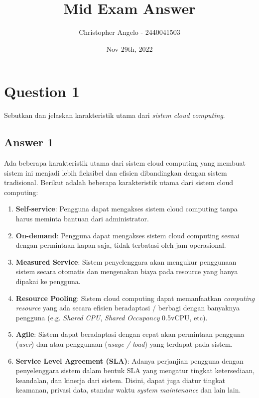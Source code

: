 \documentclass[
	11pt, %
	indonesian
]{assignment}
\author{Christopher Angelo - 2440041503}
\institute{BINUS University\\ Global Class}
\date{Nov 29th, 2022}
\title{Mid Exam Answer}
\begin{document}
\maketitle


\section*{Question 1}

\begin{problem}
Sebutkan dan jelaskan karakteristik utama dari \textit{sistem cloud computing}.
\end{problem}

\subsection*{Answer 1}

Ada beberapa karakteristik utama dari sistem cloud computing yang membuat sistem ini menjadi lebih fleksibel dan efisien dibandingkan dengan sistem tradisional. Berikut adalah beberapa karakteristik utama dari sistem cloud computing:

\begin{enumerate}
	\item \textbf{Self-service}: Pengguna dapat mengakses sistem cloud computing tanpa harus meminta bantuan dari administrator.
	\item \textbf{On-demand}: Pengguna dapat mengakses sistem cloud computing sesuai dengan permintaan kapan saja, tidak terbatasi oleh jam operasional.
	\item \textbf{Measured Service}: Sistem penyelenggara akan mengukur penggunaan sistem secara otomatis dan mengenakan biaya pada resource yang hanya dipakai ke pengguna.
	\item \textbf{Resource Pooling}: Sistem cloud computing dapat memanfaatkan \textit{computing resource} yang ada secara efisien beradaptasi / berbagi dengan banyaknya pengguna (e.g. \textit{Shared CPU}, \textit{Shared Occupancy} 0.5vCPU, etc).
	\item \textbf{Agile}: Sistem dapat beradaptasi dengan cepat akan permintaan pengguna (\textit{user}) dan atau penggunaan (\textit{usage / load}) yang terdapat pada sistem.
	\item \textbf{Service Level Agreement (SLA)}: Adanya perjanjian pengguna dengan penyelenggara sistem dalam bentuk SLA yang mengatur tingkat ketersediaan, keandalan, dan kinerja dari sistem. Disini, dapat juga diatur tingkat keamanan, privasi data, standar waktu \textit{system maintenance} dan lain lain.
\end{enumerate}
\end{document}
